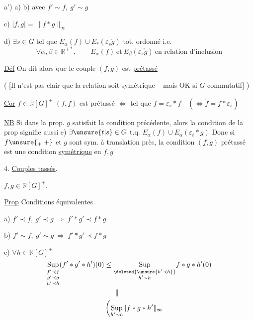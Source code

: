 a$'$)  a) b) avec $f'\sim f,\ g'\sim g$

c) $|f,g|=\|f*g\|_\infty$

d) $\exists s\in G$ tel que $E_\alpha(f)\cup E_*(\varepsilon_s\check g)$ tot. ordonné i.e.
\[
 \forall\alpha,\beta\in\mathbb R^{+*},\qquad E_\alpha(f)\ \text{et}\ E_\beta(\varepsilon_s\check g)\ \text{en relation d'inclusion}
\]

\uline{Déf} On dit alors que le couple $(f,g)$ est \uline{prétassé}

( [Il n'est pas clair que la relation soit symétrique --  mais OK si $G$ commutatif] )

\uline{Cor} $f\in\mathbb R[G]^+$  $(f,f)$ est prétassé $\Longleftrightarrow$   tel que $\check f=\varepsilon_s*f\quad(\Longleftrightarrow\check f=f*\varepsilon_s)$

\uline{NB} Si dans la prop. $g$ satisfait la condition précédente, alors la condition de la prop signifie aussi e) $\exists\unsure{t|s}\in G$ t.q. $E_\alpha(f)\cup E_\alpha(\varepsilon_t*g)$ 
 Donc si $f\unsure{{}_+|+}$ et $g$ sont sym. à translation près, la condition $(f,g)$ prétassé est une condition \uline{symétrique} en $f,g$

4. \uline{Couples tassés}.

$f,g\in\mathbb R[G]^+$.


\uline{Prop} Conditions équivalentes

a) $f'\prec f,\ g'\prec g\ \Longrightarrow\ f'*g'\prec f*g$

b) $f'\sim f,\ g'\sim g\ \Longrightarrow\ f'*g'\prec f*g$

c) $\forall h\in\mathbb R[G]^+$
\[
 \begin{aligned}
 \underset{\substack{f'\prec f\\g'\prec g\\h'\prec h}}{\operatorname{Sup}}(f'*g'*h')(0)
 &\leq\underset{\substack{\deleted{\unsure{h'\prec h}}\\h'\sim h}}{\operatorname{Sup}}f*g*h'(0)\\
 &\hphantom{{}\leq{}}\parallel\\
 &\left(\underset{h'\sim h}{\operatorname{Sup}}\|f*g*h'\|_\infty\right.
 \end{aligned}
\]

